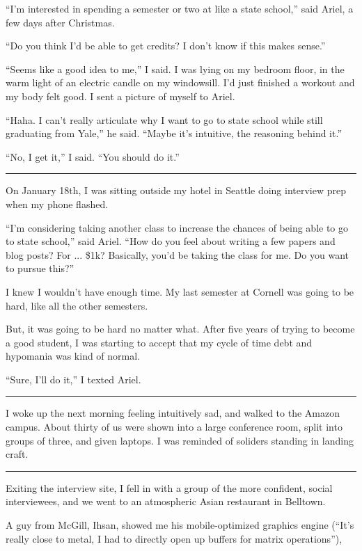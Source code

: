 ``I'm interested in spending a semester or two at like a state school,'' said
Ariel, a few days after Christmas.

``Do you think I'd be able to get credits? I don't know if this makes sense.''

``Seems like a good idea to me,'' I said. I was lying on my bedroom floor, in
the warm light of an electric candle on my windowsill. I'd just finished a
workout and my body felt good. I sent a picture of myself to Ariel.

``Haha. I can't really articulate why I want to go to state school while still
graduating from Yale,'' he said. ``Maybe it's intuitive, the reasoning behind
it.''

``No, I get it,'' I said. ``You should do it.''

\plainfancybreak{12pt}{2}{}

On January 18th, I was sitting outside my hotel in Seattle doing interview prep
when my phone flashed.

``I'm considering taking another class to increase the chances of being able to
go to state school,'' said Ariel.  ``How do you feel about writing a few papers
and blog posts?  For ... \$1k?  Basically, you'd be taking the class for me.  Do
you want to pursue this?''

I knew I wouldn't have enough time.  My last semester at Cornell was going to be
hard, like all the other semesters.

But, it was going to be hard no matter what.  After five years of trying to
become a good student, I was starting to accept that my cycle of time debt and
hypomania was kind of normal.

``Sure, I'll do it,'' I texted Ariel.

\plainfancybreak{12pt}{2}{}

I woke up the next morning feeling intuitively sad, and walked to the Amazon
campus.  About thirty of us were shown into a large conference room, split into
groups of three, and given laptops.  I was reminded of soliders standing in
landing craft.

\plainfancybreak{12pt}{2}{}

Exiting the interview site, I fell in with a group of the more confident, social
interviewees, and we went to an atmospheric Asian restaurant in Belltown.

A guy from McGill, Ihsan, showed me his mobile-optimized graphics engine
(``It's really close to metal, I had to directly open up buffers for matrix
operations''),

